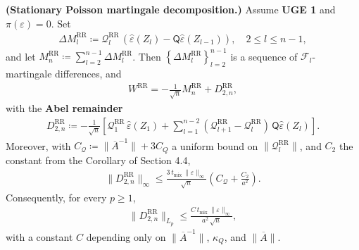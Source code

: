 \begin{lemma}\label{lem:poisson-martingale-decomp}
  \textbf{(Stationary Poisson martingale decomposition.)}
  Assume \textbf{UGE 1} and \(\pi(\varepsilon) = 0\). Set
\begin{equation}
\begin{aligned}
  \Delta M_l^{\text{RR}}
    \coloneqq \mathcal{Q}_l^{\text{RR}} \, (\widehat{\varepsilon}(Z_l) - \mathsf{Q} \widehat{\varepsilon}(Z_{l - 1})),
  \quad 2 \le l \le n - 1,
\end{aligned}
\end{equation}
  and let \(M_n^{\text{RR}} \coloneqq \sum_{l = 2}^{n - 1} \Delta M_l^{\text{RR}}\). Then
  \(\left\{\Delta M_l^{\text{RR}}\right\}_{l = 2}^{n - 1}\) is a sequence of \(\mathcal{F}_l\)-martingale
  differences, and
\begin{equation}
\begin{aligned}
  W^{\text{RR}}
    = -\frac{1}{\sqrt{n}} M_n^{\text{RR}} + D_{2, n}^{\text{RR}},
\end{aligned}
\label{eq:poisson-decomp}
\end{equation}
  with the \textbf{Abel remainder}
\begin{equation}
\begin{aligned}
  D_{2, n}^{\text{RR}}
    \coloneqq -\frac{1}{\sqrt{n}} \left[
        \mathcal{Q}_1^{\text{RR}} \, \widehat{\varepsilon}(Z_1)
        + \sum_{l = 1}^{n - 2}
            (\mathcal{Q}_{l + 1}^{\text{RR}} - \mathcal{Q}_l^{\text{RR}}) \, \mathsf{Q} \widehat{\varepsilon}(Z_l)
      \right].
\end{aligned}
\end{equation}
  Moreover, with
  \(C_{\mathcal{Q}} \coloneqq \lVert  \overline{A}^{-1}  \rVert + 3 C_Q\) a uniform bound on
  \(\lVert  \mathcal{Q}_l^{\text{RR}}  \rVert\), and \(C_2\) the constant from the Corollary of
  Section 4.4,
\begin{equation}
\begin{aligned}
  \lVert  D_{2, n}^{\text{RR}}  \rVert_\infty
    \le \frac{3 \, t_{\text{mix}} \, \lVert  \varepsilon  \rVert_\infty}{\sqrt{n}}
       \left(C_{\mathcal{Q}} + \frac{C_2}{a^2}\right).
\end{aligned}
\label{eq:D2-bound}
\end{equation}
  Consequently, for every \(p \ge 1\),
\begin{equation}
\begin{aligned}
  \lVert  D_{2, n}^{\text{RR}}  \rVert_{L_p}
    \le \frac{C \, t_{\text{mix}} \, \lVert  \varepsilon  \rVert_\infty}{a^2 \, \sqrt{n}},
\end{aligned}
\end{equation}
  with a constant \(C\) depending only on \(\lVert  \overline{A}^{-1}  \rVert\), \(\kappa_Q\),
  and \(\lVert  \overline{A}  \rVert\).
\end{lemma}

